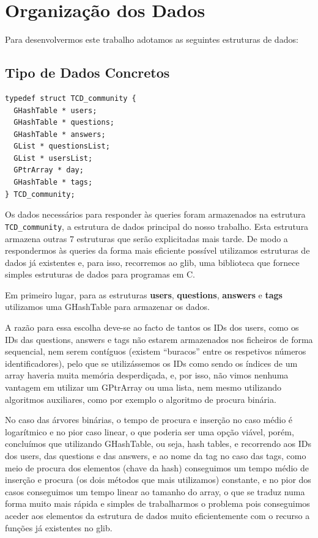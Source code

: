 \documentclass[a4paper]{article}
\begin{document}
\section{Organização dos Dados}
\label{sec:estruturadedados}

Para desenvolvermos este trabalho adotamos as seguintes estruturas de dados:

\subsection{Tipo de Dados Concretos}
\label{sec:dados_concretos}

\begin{verbatim}
typedef struct TCD_community {
  GHashTable * users;
  GHashTable * questions;
  GHashTable * answers;
  GList * questionsList;
  GList * usersList;
  GPtrArray * day;
  GHashTable * tags;
} TCD_community;
\end{verbatim}

\vspace{0.2cm}

Os dados necessários para responder às queries foram armazenados
na estrutura \texttt{TCD\_community}, a estrutura de dados principal do nosso trabalho.
Esta estrutura armazena outras 7 estruturas que serão explicitadas mais tarde.
De modo a respondermos às queries da forma mais eficiente possível
utilizamos estruturas de dados já existentes e, para isso, recorremos ao glib,
uma biblioteca que fornece simples estruturas de dados para programas em C. \par

Em primeiro lugar, para as estruturas \textbf{users}, \textbf{questions},
\textbf{answers} e \textbf{tags}
utilizamos uma GHashTable para armazenar os dados. \par
A razão para essa escolha deve-se ao facto de tantos os IDs dos users, como os
IDs das questions, answers e tags não estarem armazenados nos ficheiros de forma
sequencial, nem serem contíguos (existem ``buracos'' entre os respetivos números
identificadores), pelo que se utilizássemos os IDs como sendo os índices de um
array haveria muita memória desperdiçada, e, por isso, não vimos nenhuma vantagem
em utilizar um GPtrArray ou uma lista, nem mesmo utilizando algoritmos auxiliares,
como por exemplo o algoritmo de procura binária.

No caso das árvores binárias, o tempo de procura e inserção no caso médio é
logarítmico e no pior caso linear, o que poderia ser uma opção viável, porém,
concluímos que utilizando GHashTable, ou seja, hash tables, e recorrendo aos IDs
dos users, das questions e das answers, e ao nome da tag no caso das tags, como
meio de procura dos elementos (chave da hash) conseguimos um tempo médio de
inserção e procura (os dois métodos que mais utilizamos) constante, e no pior
dos casos conseguimos um tempo linear ao tamanho do array, o que se traduz numa
forma muito mais rápida e simples de trabalharmos o problema pois conseguimos
aceder aos elementos da estrutura de dados muito eficientemente com o
recurso a funções já existentes no glib. \par
\end{document}

